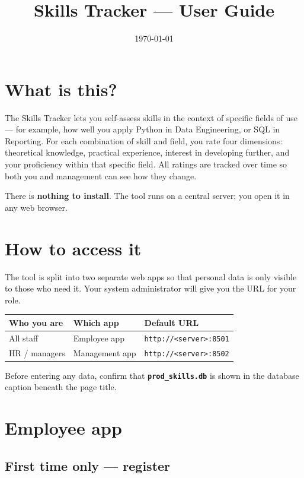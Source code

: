 \documentclass[11pt,a4paper]{article}
\title{Skills Tracker --- User Guide}
\date{\today}
\begin{document}
\maketitle
\justifying

\section*{What is this?}

The Skills Tracker lets you self-assess skills in the context of specific fields of use --- for example, how well you apply Python in Data Engineering, or SQL in Reporting.
For each combination of skill and field, you rate four dimensions: theoretical knowledge, practical experience, interest in developing further, and your proficiency within that specific field.
All ratings are tracked over time so both you and management can see how they change.

There is \textbf{nothing to install}. The tool runs on a central server; you open it in any web browser.

\section*{How to access it}

The tool is split into two separate web apps so that personal data is only visible to those who need it.
Your system administrator will give you the URL for your role.

\begin{center}
\begin{tabular}{lll}
\toprule
\textbf{Who you are} & \textbf{Which app} & \textbf{Default URL} \\
\midrule
All staff & Employee app & \texttt{http://<server>:8501} \\
HR / managers & Management app & \texttt{http://<server>:8502} \\
\bottomrule
\end{tabular}
\end{center}

Before entering any data, confirm that \textbf{\texttt{prod\_skills.db}} is shown in the database caption
beneath the page title.

\section*{Employee app}

\subsection*{First time only --- register}
\end{document}
